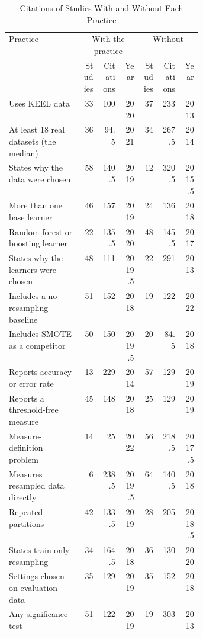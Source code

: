 \begin{table}[t]
  \caption{Citations of Studies With and Without Each Practice}
  \label{tab:empirical-cites}
  \footnotesize
  \setlength{\tabcolsep}{4pt}
  \begin{tabular}{@{}>{\raggedright\arraybackslash}p{0.38\linewidth}rrrrrr@{}}
    \toprule
    Practice & \multicolumn{3}{c}{With the practice} & \multicolumn{3}{c}{Without}\\
    & Studies & Citations & Year & Studies & Citations & Year\\
    \midrule
    Uses KEEL data & 33 & 100 & 2020 & 37 & 233 & 2013\\
    At least 18 real datasets (the median) & 36 & 94.5 & 2021 & 34 & 267.5 & 2014\\
    States why the data were chosen & 58 & 140.5 & 2019 & 12 & 320.5 & 2015.5\\
    More than one base learner & 46 & 157 & 2019 & 24 & 136 & 2018\\
    Random forest or boosting learner & 22 & 135.5 & 2020 & 48 & 145.5 & 2017\\
    States why the learners were chosen & 48 & 111 & 2019.5 & 22 & 291 & 2013\\
    Includes a no-resampling baseline & 51 & 152 & 2018 & 19 & 122 & 2022\\
    Includes SMOTE as a competitor & 50 & 150 & 2019.5 & 20 & 84.5 & 2018\\
    Reports accuracy or error rate & 13 & 229 & 2014 & 57 & 129 & 2019\\
    Reports a threshold-free measure & 45 & 148 & 2018 & 25 & 129 & 2019\\
    Measure-definition problem & 14 & 25 & 2022 & 56 & 218.5 & 2017.5\\
    Measures resampled data directly & 6 & 238.5 & 2019.5 & 64 & 140.5 & 2018\\
    Repeated partitions & 42 & 133.5 & 2019 & 28 & 205 & 2018.5\\
    States train-only resampling & 34 & 164.5 & 2018 & 36 & 130 & 2020\\
    Settings chosen on evaluation data & 35 & 129 & 2019 & 35 & 152 & 2018\\
    Any significance test & 51 & 122 & 2019 & 19 & 303 & 2013\\

\end{tabular}
\end{table}
